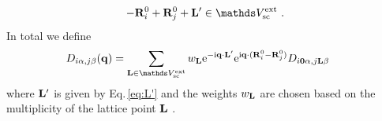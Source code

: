 \begin{align}
	- \b R_{i}^0 + \b R_{j}^0 + \b L' \in \mathds V_{\rm sc}^{\rm ext}~.
	\label{eq:L'}
\end{align}
In total we define
\begin{align}
	{D}_{i \alpha, j \beta} (\b q) 	
		&= %
		\sum_{\b L \in \mathds V_{\rm sc}^{\rm ext}} 
			w_{\b L}
		{\rm e}^{- \im \b q \cdot \b L'} {\rm e}^{\im \b q \cdot (\b R_i^0 - \b R_j^0)} {D}_{i \b 0 \alpha, j \b L \beta}~
	\label{eq:D_Parlinski}
\end{align}
where ${\bf L}'$ is given by Eq.\,\eqref{eq:L'} and the weights $w_{{\bf L}}$ are chosen based on the multiplicity of the lattice point ${\bf L}$ .

